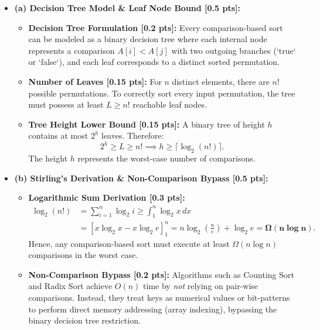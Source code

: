 \documentclass[11pt,a4paper]{article}
\begin{document}
\vspace{0.3em}

\begin{solutionbox}
\begin{itemize}
    \item \textbf{(a) Decision Tree Model \& Leaf Node Bound [0.5 pts]:}
    \begin{itemize}
        \item \textbf{Decision Tree Formulation [0.2 pts]:} Every comparison-based sort can be modeled as a binary decision tree where each internal node represents a comparison $A[i] < A[j]$ with two outgoing branches (`true` or `false`), and each leaf corresponds to a distinct sorted permutation.
        \item \textbf{Number of Leaves [0.15 pts]:} For $n$ distinct elements, there are $n!$ possible permutations. To correctly sort every input permutation, the tree must possess at least $L \ge n!$ reachable leaf nodes.
        \item \textbf{Tree Height Lower Bound [0.15 pts]:} A binary tree of height $h$ contains at most $2^h$ leaves. Therefore:
        \[
        2^h \ge L \ge n! \implies h \ge \lceil \log_2(n!) \rceil.
        \]
        The height $h$ represents the worst-case number of comparisons.
    \end{itemize}
    \item \textbf{(b) Stirling's Derivation \& Non-Comparison Bypass [0.5 pts]:}
    \begin{itemize}
        \item \textbf{Logarithmic Sum Derivation [0.3 pts]:}
        \begin{align*}
        \log_2(n!) &= \sum_{i=1}^n \log_2 i \ge \int_1^n \log_2 x \, dx \\
        &= \left[ x \log_2 x - x \log_2 e \right]_1^n = n \log_2\left(\frac{n}{e}\right) + \log_2 e = \mathbf{\Omega(n \log n)}.
        \end{align*}
        Hence, any comparison-based sort must execute at least $\Omega(n \log n)$ comparisons in the worst case.
        \item \textbf{Non-Comparison Bypass [0.2 pts]:} Algorithms such as Counting Sort and Radix Sort achieve $O(n)$ time by \textit{not} relying on pair-wise comparisons. Instead, they treat keys as numerical values or bit-patterns to perform direct memory addressing (array indexing), bypassing the binary decision tree restriction.
    \end{itemize}
\end{itemize}
\end{solutionbox}
\end{document}
